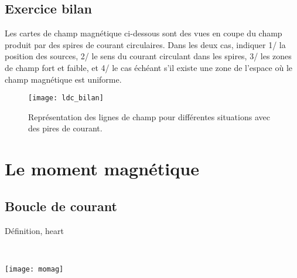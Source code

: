 \documentclass[../main/main.tex]{subfiles}
\begin{document}
\subsection{Exercice bilan}
\label{ssec:bilandir}
Les cartes de champ magnétique ci-dessous sont des vues en coupe du champ
produit par des spires de courant circulaires. Dans les deux cas, indiquer 1/ la
position des sources, 2/ le sens du courant circulant dans les spires, 3/ les
zones de champ fort et faible, et 4/ le cas échéant s'il existe une zone de
l'espace où le champ magnétique est uniforme.
\begin{figure}[h]
  \centering
  \texttt{[image: ldc\_bilan]}
  \caption{Représentation des lignes de champ pour différentes situations avec
  des pires de courant.}
  \label{fig:ldc_bilan}
\end{figure}

\vspace*{-10pt}

\section{Le moment magnétique}
\label{sec:momag}
\subsection{Boucle de courant}
\label{ssec:magboucle}
\begin{tdefi}{Définition, heart}
  \begin{minipage}[t]{.48\linewidth}
  \end{minipage}
  \hfill
  \begin{minipage}[t]{.48\linewidth}
    ~
    \vspace{0pt}
    \begin{center}
      \texttt{[image: momag]}
      \label{fig:momag}
    \end{center}
  \end{minipage}
\end{tdefi}
\end{document}

